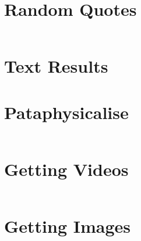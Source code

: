 \section{Random Quotes}

\inputminted[firstline=12,lastline=22]{python}{back/code/textsurfer.py}
% 

\section{Text Results}

% 

\section{Pataphysicalise}

\inputminted[firstline=24,lastline=37]{python}{back/code/textsurfer.py}
% 

\section{Getting Videos}

\inputminted[firstline=40,lastline=79]{python}{back/code/textsurfer.py}
% 

\section{Getting Images}

\inputminted[firstline=40,lastline=79]{python}{back/code/textsurfer.py}
% 
